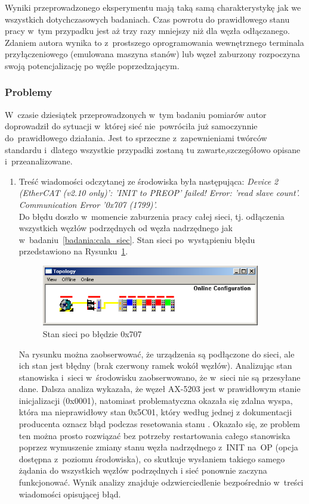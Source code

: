 Wyniki przeprowadzonego eksperymentu mają taką samą charakterystykę jak we wszystkich dotychczasowych badaniach. Czas powrotu do prawidłowego stanu pracy w~tym przypadku jest aż trzy razy mniejszy niż dla węzła odłączanego. Zdaniem autora wynika to z~prostszego oprogramowania wewnętrznego terminala przyłączeniowego (emulowana maszyna stanów) lub węzeł zaburzony rozpoczyna swoją potencjalizację po węźle poprzedzającym.

\clearpage
\subsubsection{Problemy}
W~czasie dziesiątek przeprowadzonych w~tym badaniu pomiarów autor doprowadził do sytuacji w~której sieć nie~powróciła już samoczynnie do~prawidłowego działania. Jest to sprzeczne z~zapewnieniami twórców standardu i~dlatego wszystkie przypadki zostaną tu zawarte,szczegółowo opisane i~przeanalizowane.

\begin{enumerate}
\item Treść wiadomości odczytanej ze środowiska była następująca: \textit{Device 2 (EtherCAT (v2.10 only)': 'INIT to PREOP' failed! Error: 'read slave count'. Communication Error '0x707 (1799)'.} \\[1mm]
Do błędu doszło w~momencie zaburzenia pracy całej sieci, tj. odłączenia wszystkich węzłów podrzędnych od węzła nadrzędnego jak w~badaniu~\ref{badania:cala_siec}. Stan sieci po~wystąpieniu błędu przedstawiono na Rysunku~\ref{err0x707}.
\begin{figure}[!htb] 	\centering 	\includegraphics[width=0.9\textwidth]{images/err0x707} \caption{Stan sieci po błędzie 0x707} \label{err0x707} \end{figure}

Na rysunku można zaobserwować, że urządzenia są podłączone do sieci, ale ich stan jest błędny (brak czerwony ramek wokół węzłów). Analizując stan stanowiska i~sieci w~środowisku zaobserwowano, że w~sieci nie są przesyłane dane.
Dalsza analiza wykazała, że węzeł AX-5203 jest w prawidłowym stanie inicjalizacji (0x0001), natomiast problematyczna okazała się zdalna wyspa, która ma nieprawidłowy stan 0x5C01, który według jednej z dokumentacji producenta oznacz błąd podczas resetowania stanu \cite{err0x707}.
Okazało się, ze problem ten można prosto rozwiązać bez potrzeby restartowania całego stanowiska poprzez wymuszenie zmiany stanu węzła nadrzędnego z~INIT na~OP (opcja dostępna z~poziomu środowiska), co skutkuje wysłaniem takiego samego żądania do wszystkich węzłów podrzędnych i sieć ponownie zaczyna funkcjonować. Wynik analizy znajduje odzwierciedlenie bezpośrednio w~treści wiadomości opisującej błąd.
\end{enumerate}

